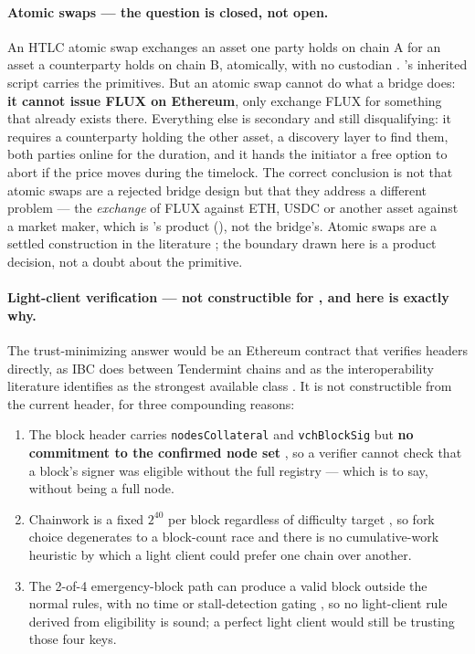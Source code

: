 \paragraph{Atomic swaps --- the question is closed, not open.} An HTLC atomic swap exchanges an
asset one party holds on chain A for an asset a counterparty holds on chain B, atomically, with no
custodian \citep{herlihy2018atomic}. \Flux's inherited script carries the primitives. But an atomic
swap cannot do what a bridge does: \textbf{it cannot issue FLUX on Ethereum}, only exchange FLUX for
something that already exists there. Everything else is secondary and still disqualifying: it
requires a counterparty holding the other asset, a discovery layer to find them, both parties online
for the duration, and it hands the initiator a free option to abort if the price moves during the
timelock. The correct conclusion is not that atomic swaps are a rejected bridge design but that they
address a different problem --- the \emph{exchange} of FLUX against ETH, USDC or another asset
against a market maker, which is \FusionX's product (), not the
bridge's. Atomic swaps are a settled construction in the literature \citep{herlihy2018atomic}; the boundary drawn here is a product decision, not a doubt about the primitive.

\paragraph{Light-client verification --- not constructible for \Flux, and here is exactly why.} The
trust-minimizing answer would be an Ethereum contract that verifies \Flux headers directly, as IBC
does between Tendermint chains \citep{cosmosibc} and as the interoperability literature identifies as
the strongest available class \citep{zamyatin2021sok}. It is not constructible from the current
\PoN header, for three compounding reasons:

\begin{enumerate}
\item The \PoN block header carries \texttt{nodes\allowbreak{}Collateral} and \texttt{vchBlockSig} but
      \textbf{no commitment to the confirmed node set}
      , so a verifier cannot check that a
      block's signer was eligible without the full \FluxNode registry --- which is to say, without
      being a full node.
\item Chainwork is a fixed $2^{40}$ per block regardless of difficulty target
      , so fork choice degenerates to a block-count race and
      there is no cumulative-work heuristic by which a light client could prefer one chain over
      another.
\item The 2-of-4 emergency-block path can produce a valid block outside the normal rules, with no
      time or stall-detection gating , so no
      light-client rule derived from \PoN eligibility is sound; a perfect light client would still
      be trusting those four keys.
\end{enumerate}

